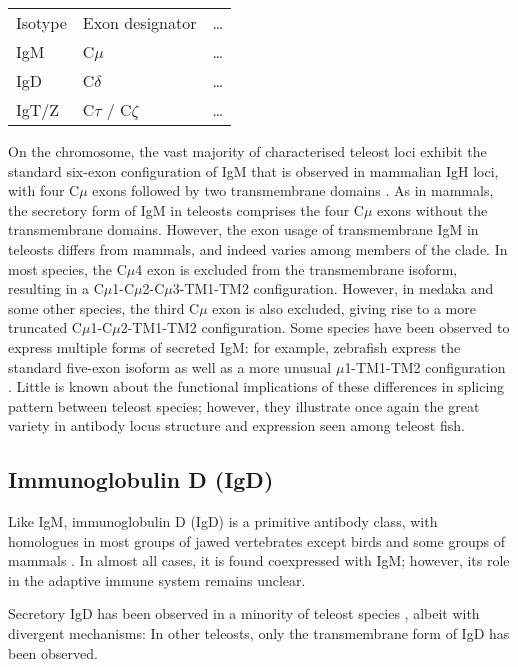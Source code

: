 \begin{table}
\begin{tabular}{lll} %
Isotype & Exon designator & \dots \\
IgM & C$\mu$ & \dots \\
IgD & C$\delta$ & \dots \\
IgT/Z & C$\tau$ / C$\zeta$ & \dots \\ %
\end{tabular}
\end{table}

On the chromosome, the vast majority of characterised teleost loci exhibit the standard six-exon configuration of IgM that is observed in mammalian IgH loci, with four C$\mu$ exons followed by two transmembrane domains \citep{fillatreau2013astonishing}. %
As in mammals, the secretory form of IgM in teleosts comprises the four C$\mu$ exons without the transmembrane domains. However, the exon usage of transmembrane IgM in teleosts differs from mammals, and indeed varies among members of the clade. In most species, the C$\mu$4 exon is excluded from the transmembrane isoform, resulting in a C$\mu$1-C$\mu$2-C$\mu$3-TM1-TM2 configuration. However, in medaka and some other species, the third C$\mu$ exon is also excluded, giving rise to a more truncated C$\mu$1-C$\mu$2-TM1-TM2 configuration. %
Some species have been observed to express multiple forms of secreted IgM: for example, zebrafish express the standard five-exon isoform as well as a more unusual $\mu$1-TM1-TM2 configuration \citep{fillatreau2013astonishing}. Little is known about the functional implications of these differences in splicing pattern between teleost species; however, they illustrate once again the great variety in antibody locus structure and expression seen among teleost fish.

\subsection{Immunoglobulin D (IgD)}

Like IgM, immunoglobulin D (IgD) is a primitive antibody class, with homologues in most groups of jawed vertebrates except birds and some groups of mammals \citep{fillatreau2013astonishing}. %
In almost all cases, it is found coexpressed with IgM; however, its role in the adaptive immune system remains unclear. %

Secretory IgD has been observed in a minority of teleost species %
, albeit with divergent mechanisms: %
In other teleosts, only the transmembrane form of IgD has been observed.

